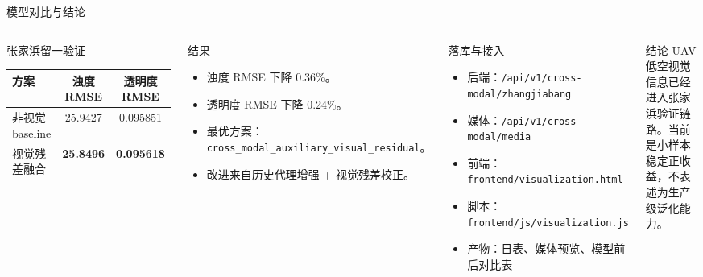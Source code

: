 \documentclass{beamer}
\begin{document}
\begin{frame}[t]{模型对比与结论}
\footnotesize
\begin{columns}[T,onlytextwidth]
\begin{block}{张家浜留一验证}
\centering
\begin{tabular}{lcc}
\toprule
方案 & 浊度 RMSE & 透明度 RMSE \\
\midrule
非视觉 baseline & 25.9427 & 0.095851 \\
视觉残差融合 & \textbf{25.8496} & \textbf{0.095618} \\
\bottomrule
\end{tabular}
\end{block}

\begin{block}{结果}
\begin{itemize}
    \item 浊度 RMSE 下降 0.36\%。
    \item 透明度 RMSE 下降 0.24\%。
    \item 最优方案：\texttt{cross\_modal\_auxiliary\_visual\_residual}。
    \item 改进来自历史代理增强 + 视觉残差校正。
\end{itemize}
\end{block}

\begin{block}{落库与接入}
\begin{itemize}
    \item 后端：\texttt{/api/v1/cross-modal/zhangjiabang}
    \item 媒体：\texttt{/api/v1/cross-modal/media}
    \item 前端：\texttt{frontend/visualization.html}
    \item 脚本：\texttt{frontend/js/visualization.js}
    \item 产物：日表、媒体预览、模型前后对比表
\end{itemize}
\end{block}

\begin{block}{结论}
UAV 低空视觉信息已经进入张家浜验证链路。当前是小样本稳定正收益，不表述为生产级泛化能力。
\end{block}
\end{columns}
\end{frame}
\end{document}
